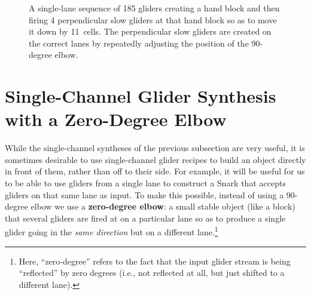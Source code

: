 \begin{figure}[!htb]
	
	\caption{A single-lane sequence of 185 gliders creating a hand block and then firing 4 perpendicular slow gliders at that hand block so as to move it down by 11~cells. The perpendicular slow gliders are created on the correct lanes by repeatedly adjusting the position of the 90-degree elbow.}\label{fig:90_degree_block_move}
\end{figure}



\section{Single-Channel Glider Synthesis with a Zero-Degree Elbow}\label{sec:single_channel_synth_0}

While the single-channel syntheses of the previous subsection are very useful, it is sometimes desirable to use single-channel glider recipes to build an object directly in front of them, rather than off to their side. For example, it will be useful for us to be able to use gliders from a single lane to construct a Snark that accepts gliders on that same lane as input. To make this possible, instead of using a 90-degree elbow we use a \textbf{zero-degree elbow}: a small stable object (like a block) that several gliders are fired at on a particular lane so as to produce a single glider going in the \emph{same direction} but on a different lane.\footnote{Here, ``zero-degree'' refers to the fact that the input glider stream is being ``reflected'' by zero degrees (i.e., not reflected at all, but just shifted to a different lane).}


